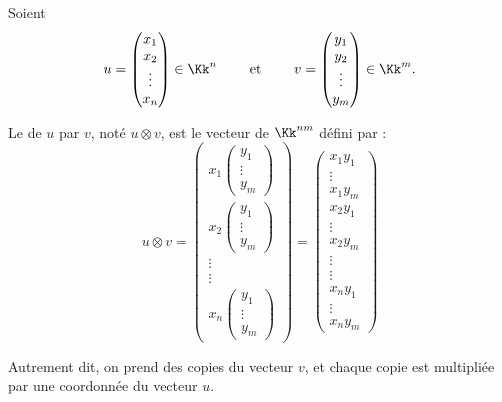 \documentclass[11pt,class=report,crop=false]{standalone}
\begin{document}
Soient 
$$
u = \begin{pmatrix}x_1\\x_2\\\vdots\\x_n\end{pmatrix} \in \Kk^n
\qquad\text{ et }\qquad
v = \begin{pmatrix}y_1\\y_2\\\vdots\\y_m\end{pmatrix} \in \Kk^m.
$$

Le  de $u$ par $v$, noté $u \otimes v$, est le vecteur de $\Kk^{nm}$ défini par :
$$
u \otimes v
= \begin{pmatrix}
x_1 \begin{pmatrix}y_1\\ \vdots\\y_m\end{pmatrix}\\
x_2\begin{pmatrix}y_1\\ \vdots\\y_m\end{pmatrix}\\
\vdots\\
\vdots\\
x_n\begin{pmatrix}y_1\\\vdots\\y_m\end{pmatrix}\end{pmatrix}
= 
\begin{pmatrix}
x_1 y_1\\\vdots\\x_1 y_m\\x_2 y_1\\\vdots\\x_2 y_m\\\vdots\\\vdots
\\x_n y_1\\\vdots\\x_n y_m\end{pmatrix}
$$

Autrement dit, on  prend des copies du vecteur $v$, et chaque copie est multipliée par une coordonnée du vecteur $u$.
\end{document}
